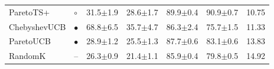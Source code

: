 \begin{tabular}{llrrrrr}
ParetoTS+ & $\circ$ & 31.5{\scriptsize$\pm$1.9} & 28.6{\scriptsize$\pm$1.7} & 89.9{\scriptsize$\pm$0.4} & 90.9{\scriptsize$\pm$0.7} & 10.75\\
ChebyshevUCB & $\bullet$ & 68.8{\scriptsize$\pm$6.5} & 35.7{\scriptsize$\pm$4.7} & 86.3{\scriptsize$\pm$2.4} & 75.7{\scriptsize$\pm$1.5} & 11.33\\
ParetoUCB & $\bullet$ & 28.9{\scriptsize$\pm$1.2} & 25.5{\scriptsize$\pm$1.3} & 87.7{\scriptsize$\pm$0.6} & 83.1{\scriptsize$\pm$0.6} & 13.83\\
RandomK & -- & 26.3{\scriptsize$\pm$0.9} & 21.4{\scriptsize$\pm$1.1} & 85.9{\scriptsize$\pm$0.4} & 79.8{\scriptsize$\pm$0.5} & 14.92\\
\bottomrule
\end{tabular}
